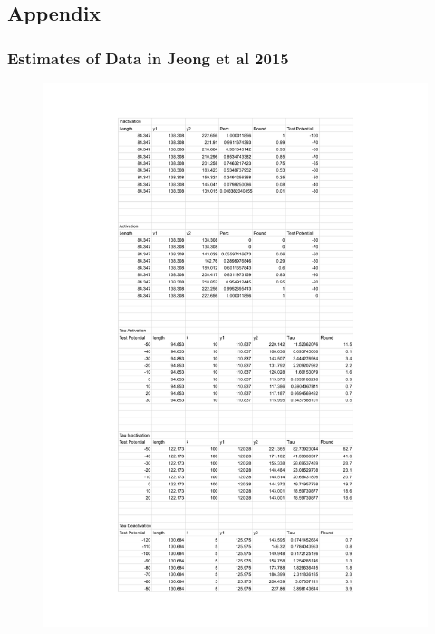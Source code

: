 \documentclass[../../workflow.tex]{subfiles}
\begin{document}
\newpage
\subsection{Appendix}

\subsubsection{Estimates of Data in Jeong et al 2015}\label{sec_estimates_of_jeong_2015}

\begin{figure}[H]
    \centering
    \includegraphics[height=0.9\textheight]{Handwritten Notes/R5 Model/T Type (Jeong) - Activation_Inactivation.pdf}
\end{figure}
\end{document}
